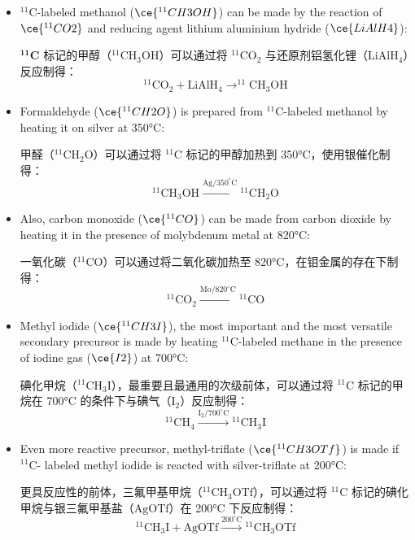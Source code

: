 \documentclass[dvipsnames, svgnames,a4paper,11pt]{article}
\begin{document}
\begin{itemize}
    \item ${}^\mathrm{11}\mathrm{C}$-labeled methanol (\(\ce{^{11}CH3OH}\)) can be made by the reaction of \(\ce{^{11}CO2}\) and
    reducing agent lithium aluminium hydride (\(\ce{LiAlH4}\)):
    
    $\mathbf{^{11}C}$ 标记的甲醇（$\mathrm{^{11}CH_3OH}$）可以通过将 $\mathrm{^{11}CO_2}$ 与还原剂铝氢化锂（$\mathrm{LiAlH_4}$）反应制得：
    \[
    \mathrm{^{11}CO_2 + LiAlH_4 \longrightarrow ^{11}CH_3OH}
    \]
    
    \item Formaldehyde (\(\ce{^{11}CH2O}\)) is prepared from ${}^\mathrm{11}\mathrm{C}$-labeled methanol by heating it on silver at 350°C:
    
    甲醛（$\mathrm{^{11}CH_2O}$）可以通过将 $\mathrm{{}^{11}C}$ 标记的甲醇加热到 350°C，使用银催化制得：
    \[
    \mathrm{^{11}CH_3OH \xrightarrow{Ag/350^\circ C} {}^{11}CH_2O}
    \]
    
    \item Also, carbon monoxide (\(\ce{^{11}CO}\)) can be made from carbon dioxide by heating it in the presence of molybdenum metal at 820°C:
    
    一氧化碳（$\mathrm{^{11}CO}$）可以通过将二氧化碳加热至 820°C，在钼金属的存在下制得：
    \[
    \mathrm{^{11}CO_2 \xrightarrow{Mo/820^\circ C} {}^{11}CO}
    \]
    
    \item Methyl iodide (\(\ce{^{11}CH3I}\)), the most important and the most versatile secondary
    precursor is made by heating ${}^\mathrm{11}\mathrm{C}$-labeled methane in the presence of iodine gas (\(\ce{I2}\)) at 700°C:
    
    碘化甲烷（$\mathrm{^{11}CH_3I}$），最重要且最通用的次级前体，可以通过将 $\mathrm{^{11}C}$ 标记的甲烷在 700°C 的条件下与碘气（$\mathrm{I_2}$）反应制得：
    \[
    \mathrm{^{11}CH_4 \xrightarrow{I_2/700^\circ C} {}^{11}CH_3I}
    \]
    
    \item Even more reactive precursor, methyl-triflate (\(\ce{^{11}CH3OTf}\)) is made if ${}^\mathrm{11}\mathrm{C}$-
    labeled methyl iodide is reacted with silver-triflate at 200°C:
    
    更具反应性的前体，三氟甲基甲烷（$\mathrm{^{11}CH_3OTf}$），可以通过将 $\mathrm{^{11}C}$ 标记的碘化甲烷与银三氟甲基盐（$\mathrm{AgOTf}$）在 200°C 下反应制得：
    \[
    \mathrm{^{11}CH_3I + AgOTf \xrightarrow{200^\circ C} {}^{11}CH_3OTf}
    \]
    

\end{itemize}
\end{document}
